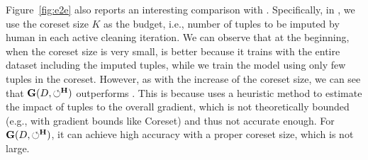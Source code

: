 Figure~\ref{fig:e2e} also reports an interesting comparison with \actclean. Specifically, 
in \actclean, we use the coreset size $K$ as the budget, i.e., number of tuples to be imputed by human in each active cleaning iteration. 
We can observe that at the beginning, when the coreset size is very small, \actclean is better because it trains with the entire dataset including the imputed tuples, while we train the model using only  few tuples in the coreset.
However, as with the increase of the coreset size, we can see that $\mathbf{G}(D,\circlearrowleft^\mathbf{H})$ outperforms \actclean. This is because \actclean uses a heuristic method to estimate the impact of tuples to the overall gradient, which is not theoretically bounded (e.g., with gradient bounds like Coreset) and thus not accurate enough.
For $\mathbf{G}(D,\circlearrowleft^\mathbf{H})$, it can achieve high accuracy with a proper coreset size, which is not large.










 